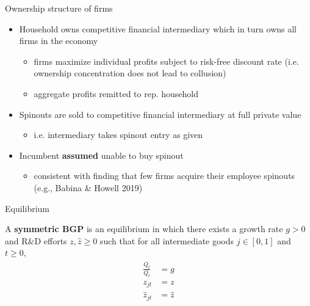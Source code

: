 \documentclass[english,usenames,dvipsnames,handout]{beamer}
\begin{document}
\begin{frame}{Ownership structure of firms}
	\begin{itemize}
		\item Household owns competitive financial intermediary which in turn owns all firms in the economy
		\begin{itemize}
			\item firms maximize individual profits subject to risk-free discount rate (i.e. ownership concentration does not lead to collusion)
			\item aggregate profits remitted to rep. household
		\end{itemize}
		\medskip
		\item Spinouts are sold to competitive financial intermediary at full private value
		\begin{itemize}
			\item i.e. intermediary takes spinout entry as given
		\end{itemize}
		\medskip
		\item Incumbent \alert{\textbf{assumed}} unable to buy spinout 
		\begin{itemize}
			\item consistent with finding that few firms acquire their employee spinouts (e.g., Babina \& Howell 2019)
		\end{itemize}
	\end{itemize}
\end{frame}

\begin{frame}{Equilibrium}\label{definition:symmetric_bgp}
	\hyperlink{definition:equilibrium}{}
	\begin{definition}
		A \textbf{symmetric BGP} is an equilibrium in which there exists a growth rate $g > 0$ and R\&D efforts $z,\hat{z} \ge 0$ such that for all intermediate goods $j \in [0,1]$ and $t \ge 0$, 
		\begin{align*}
			\frac{\dot{Q}_t}{Q_t} &= g \\
			z_{jt} &= z \\
			\hat{z}_{jt} &= \hat{z}
		\end{align*}
	\end{definition}
\end{frame}
\end{document}
